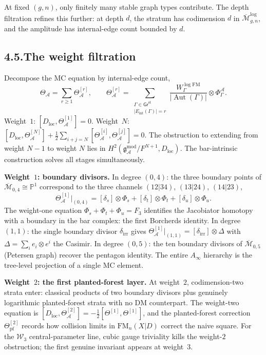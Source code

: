 \documentclass[11pt]{report}
\theoremstyle{definition}
\theoremstyle{remark}
\providecommand{\cA}{\mathcal{A}}
\providecommand{\cM}{\mathcal{M}}
\providecommand{\gAmod}{\mathfrak{g}^{\mathrm{mod}}_\cA}
\numberwithin{equation}{section}
\begin{document}
At fixed $(g,n)$, only finitely many stable graph types contribute.
The depth filtration refines this further: at depth $d$, the stratum
has codimension $d$ in $\overline{\cM}_{g,n}^{\log}$, and the
amplitude has internal-edge count bounded by $d$.

\subsection*{4.5.\enspace The weight filtration}

Decompose the MC equation by internal-edge count,
\[
\Theta_\cA=\sum_{r\ge 1}\Theta^{[r]}_\cA,\qquad\Theta^{[r]}_\cA=\sum_{\substack{\Gamma\in\mathsf{Gr}^{\mathrm{st}}\\|E_{\mathrm{int}}(\Gamma)|=r}}\frac{W^{\log\mathrm{FM}}_\Gamma}{|\operatorname{Aut}(\Gamma)|}\otimes\Phi^\cA_\Gamma.
\]
Weight~$1$: $[D_{\mathrm{loc}},\Theta^{[1]}_\cA]=0$. Weight~$N$:
$[D_{\mathrm{loc}},\Theta^{[N]}_\cA]+\tfrac12\sum_{i+j=N}[\Theta^{[i]}_\cA,\Theta^{[j]}_\cA]=0$.
The obstruction to extending from weight $N-1$ to weight $N$ lies in
$H^2(\gAmod/F^{N+1},D_{\mathrm{loc}})$. The bar-intrinsic
construction solves all stages simultaneously.

\medskip
\noindent\textbf{Weight~$1$: boundary divisors.}\enspace
In degree $(0,4)$: the three boundary points of
$\overline{\cM}_{0,4}\cong\mathbb P^1$ correspond to the three
channels $(12|34)$, $(13|24)$, $(14|23)$,
\[
\Theta^{[1]}_\cA\big|_{(0,4)}=[\delta_s]\otimes\Phi_s+[\delta_t]\otimes\Phi_t+[\delta_u]\otimes\Phi_u.
\]
The weight-one equation $\Phi_s+\Phi_t+\Phi_u=F_3$ identifies the
Jacobiator homotopy with a boundary in the bar complex: the first
Borcherds identity. In degree $(1,1)$: the single boundary divisor
$\delta_{\mathrm{irr}}$ gives
$\Theta^{[1]}_\cA|_{(1,1)}=[\delta_{\mathrm{irr}}]\otimes\Delta$ with
$\Delta=\sum_i e_i\otimes e^i$ the Casimir. In degree $(0,5)$: the
ten boundary divisors of $\overline{\cM}_{0,5}$ (Petersen graph)
recover the pentagon identity. The entire $A_\infty$ hierarchy is
the tree-level projection of a single MC element.

\medskip
\noindent\textbf{Weight~$2$: the first planted-forest layer.}\enspace
At weight~$2$, codimension-two strata enter: classical products of
two boundary divisors plus genuinely logarithmic planted-forest
strata with no DM counterpart. The weight-two equation is
$[D_{\mathrm{loc}},\Theta^{[2]}_\cA]=-\tfrac12[\Theta^{[1]},\Theta^{[1]}]$,
and the planted-forest correction $\Theta^{[2]}_{\mathrm{pf}}$ records
how collision limits in $\mathrm{FM}_n(X|D)$ correct the naive square.
For the $\mathcal W_3$ central-parameter line, cubic gauge triviality
kills the weight-$2$ obstruction; the first genuine invariant appears
at weight~$3$.
\end{document}
